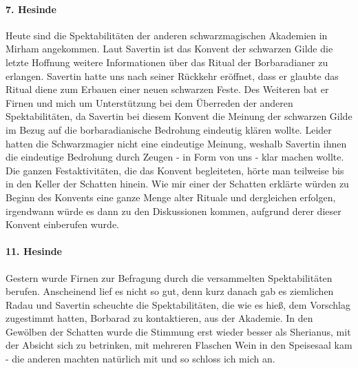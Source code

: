 \paragraph{7. Hesinde}
Heute sind die Spektabilitäten der anderen schwarzmagischen Akademien in Mirham angekommen. Laut Savertin ist das Konvent der schwarzen Gilde die letzte Hoffnung weitere Informationen über das Ritual der Borbaradianer zu erlangen. Savertin hatte uns nach seiner Rückkehr eröffnet, dass er glaubte das Ritual diene zum Erbauen einer neuen schwarzen Feste. Des Weiteren bat er Firnen und mich um Unterstützung bei dem Überreden der anderen Spektabilitäten, da Savertin bei diesem Konvent die Meinung der schwarzen Gilde im Bezug auf die borbaradianische Bedrohung eindeutig klären wollte. Leider hatten die Schwarzmagier nicht eine eindeutige Meinung, weshalb Savertin ihnen die eindeutige Bedrohung durch Zeugen - in Form von uns - klar machen wollte. Die ganzen Festaktivitäten, die das Konvent begleiteten, hörte man teilweise bis in den Keller der Schatten hinein. Wie mir einer der Schatten erklärte würden zu Beginn des Konvents eine ganze Menge alter Rituale und dergleichen erfolgen, irgendwann würde es dann zu den Diskussionen kommen, aufgrund derer dieser Konvent einberufen wurde.

\paragraph{11. Hesinde}
Gestern wurde Firnen zur Befragung durch die versammelten Spektabilitäten berufen. Anscheinend lief es nicht so gut, denn kurz danach gab es ziemlichen Radau und Savertin scheuchte die Spektabilitäten, die wie es hieß, dem Vorschlag zugestimmt hatten, Borbarad zu kontaktieren, aus der Akademie. In den Gewölben der Schatten wurde die Stimmung erst wieder besser als Sherianus, mit der Absicht sich zu betrinken, mit mehreren Flaschen Wein in den Speisesaal kam - die anderen machten natürlich mit und so schloss ich mich an.

